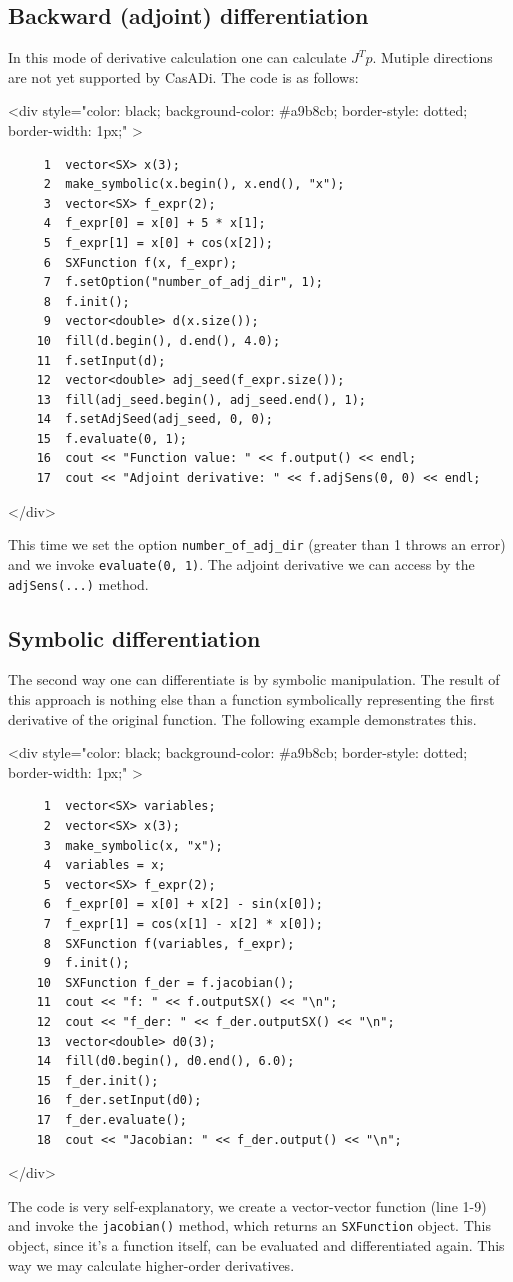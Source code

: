 \documentclass[a4paper,12pt]{book}
\newcommand{\codebegin}{
\begin{rawhtml}
<div style="color: black; background-color: \#a9b8cb;  border-style: dotted; border-width: 1px;" >
\end{rawhtml}
}
\newcommand{\codeend}{
\begin{rawhtml}
</div>
\end{rawhtml}
}
\newcommand{\codebegin}{

}
\newcommand{\codeend}{

}
\begin{document}
{\subsection*{Backward (adjoint) differentiation}
In this mode of derivative calculation one can calculate $J^T p$. Mutiple directions are not yet supported by CasADi.
The code is as follows:
\par
\codebegin
\begin{verbatim}
     1  vector<SX> x(3);
     2  make_symbolic(x.begin(), x.end(), "x");
     3  vector<SX> f_expr(2);
     4  f_expr[0] = x[0] + 5 * x[1];
     5  f_expr[1] = x[0] + cos(x[2]);
     6  SXFunction f(x, f_expr);
     7  f.setOption("number_of_adj_dir", 1);
     8  f.init();
     9  vector<double> d(x.size());
    10  fill(d.begin(), d.end(), 4.0);
    11  f.setInput(d);
    12  vector<double> adj_seed(f_expr.size());
    13  fill(adj_seed.begin(), adj_seed.end(), 1);
    14  f.setAdjSeed(adj_seed, 0, 0);
    15  f.evaluate(0, 1);
    16  cout << "Function value: " << f.output() << endl;
    17  cout << "Adjoint derivative: " << f.adjSens(0, 0) << endl;
\end{verbatim}
\codeend
This time we set the option \texttt{number\_of\_adj\_dir} (greater than 1 throws an error) and we invoke \texttt{evaluate(0, 1)}.
The adjoint derivative we can access by the \texttt{adjSens(...)} method.
\par
\subsection*{Symbolic differentiation}
The second way one can differentiate is by symbolic manipulation. The result of this approach is nothing else than a
function symbolically representing the first derivative of the original function. The following example demonstrates this.
\par
\codebegin
\begin{verbatim}
     1  vector<SX> variables;
     2  vector<SX> x(3);
     3  make_symbolic(x, "x");
     4  variables = x;
     5  vector<SX> f_expr(2);
     6  f_expr[0] = x[0] + x[2] - sin(x[0]);
     7  f_expr[1] = cos(x[1] - x[2] * x[0]);
     8  SXFunction f(variables, f_expr);
     9  f.init();
    10  SXFunction f_der = f.jacobian();
    11  cout << "f: " << f.outputSX() << "\n"; 
    12  cout << "f_der: " << f_der.outputSX() << "\n";
    13  vector<double> d0(3);
    14  fill(d0.begin(), d0.end(), 6.0);
    15  f_der.init();
    16  f_der.setInput(d0);
    17  f_der.evaluate();
    18  cout << "Jacobian: " << f_der.output() << "\n"; 
\end{verbatim}
\codeend
The code is very self-explanatory, we create a vector-vector function (line 1-9) and invoke the \texttt{jacobian()} method, which
returns an \texttt{SXFunction} object. This object, since it's a function itself, can be evaluated and differentiated again.
This way we may calculate higher-order derivatives.


}
\end{document}
